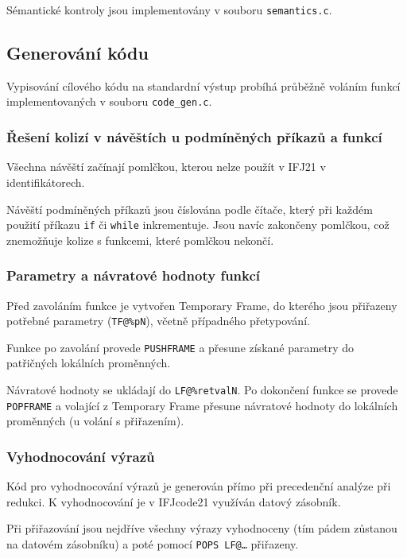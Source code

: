 \documentclass[a4paper]{article}
\theoremstyle{definition}
\begin{document}
Sémantické kontroly jsou implementovány v souboru \texttt{semantics.c}.

\subsection{Generování kódu}

Vypisování cílového kódu na standardní výstup probíhá průběžně voláním funkcí implementovaných v souboru \texttt{code\_gen.c}. 

\subsubsection{Řešení kolizí v návěštích u podmíněných příkazů a funkcí}

Všechna návěští začínají pomlčkou, kterou nelze použít v IFJ21 v identifikátorech.

Návěští podmíněných příkazů jsou číslována podle čítače, který při každém použití příkazu \texttt{if} či \texttt{while} inkrementuje. Jsou navíc zakončeny pomlčkou, což znemožňuje kolize s funkcemi, které pomlčkou nekončí.


\subsubsection{Parametry a návratové hodnoty funkcí}

Před zavoláním funkce je vytvořen Temporary Frame, do kterého jsou přiřazeny potřebné parametry (\texttt{TF@\%pN}), včetně případného přetypování.

Funkce po zavolání provede \texttt{PUSHFRAME} a přesune získané parametry do patřičných lokálních proměnných.

Návratové hodnoty se ukládají do \texttt{LF@\%retvalN}. Po dokončení funkce se provede \texttt{POPFRAME} a volající z Temporary Frame přesune návratové hodnoty do lokálních proměnných (u volání s přiřazením).

\subsubsection{Vyhodnocování výrazů}

Kód pro vyhodnocování výrazů je generován přímo při precedenční analýze při redukci. K vyhodnocování je v IFJcode21 využíván datový zásobník. 

Při přiřazování jsou nejdříve všechny výrazy vyhodnoceny (tím pádem zůstanou na datovém zásobníku) a poté pomocí \texttt{POPS LF@\dots} přiřazeny.
\end{document}
